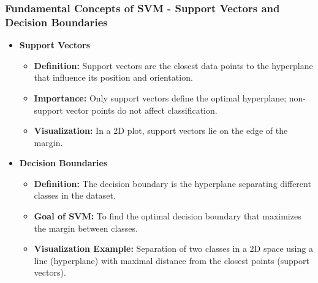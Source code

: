 \documentclass{beamer}
\begin{document}
\begin{frame}[fragile]
    \frametitle{Fundamental Concepts of SVM - Support Vectors and Decision Boundaries}
    \begin{itemize}
        \item \textbf{Support Vectors}
        \begin{itemize}
            \item \textbf{Definition:} Support vectors are the closest data points to the hyperplane that influence its position and orientation.
            \item \textbf{Importance:} Only support vectors define the optimal hyperplane; non-support vector points do not affect classification.
            \item \textbf{Visualization:} In a 2D plot, support vectors lie on the edge of the margin.
        \end{itemize}

        \item \textbf{Decision Boundaries}
        \begin{itemize}
            \item \textbf{Definition:} The decision boundary is the hyperplane separating different classes in the dataset.
            \item \textbf{Goal of SVM:} To find the optimal decision boundary that maximizes the margin between classes.
            \item \textbf{Visualization Example:} Separation of two classes in a 2D space using a line (hyperplane) with maximal distance from the closest points (support vectors).
        \end{itemize}
    \end{itemize}
\end{frame}
\end{document}

